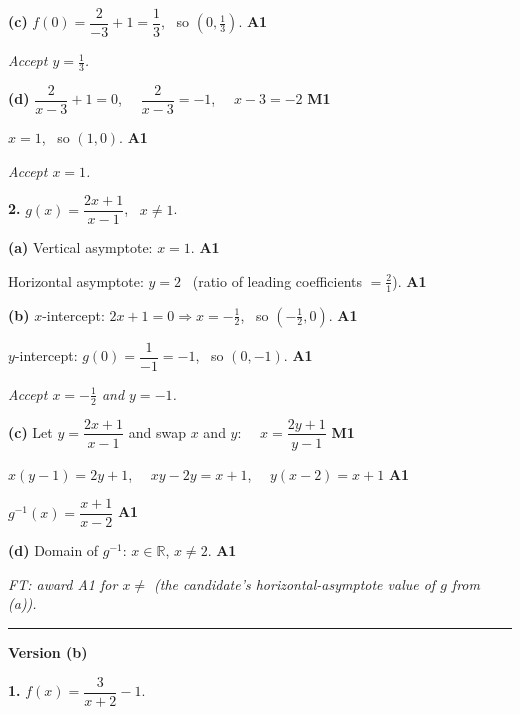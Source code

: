 \documentclass[12pt, twoside]{article}
\begin{document}
\textbf{(c)} $f(0)=\dfrac{2}{-3}+1=\dfrac{1}{3}$, \ so $\left(0,\tfrac{1}{3}\right)$. \hfill \textbf{A1}

\emph{Accept $y=\tfrac{1}{3}$.}

\medskip

\textbf{(d)} $\dfrac{2}{x-3}+1=0$, \ \ $\dfrac{2}{x-3}=-1$, \ \ $x-3=-2$ \hfill \textbf{M1}

$x=1$, \ so $(1,0)$. \hfill \textbf{A1}

\emph{Accept $x=1$.}

\medskip

\noindent\textbf{2.} $\displaystyle g(x)=\dfrac{2x+1}{x-1}$, \ $x\ne 1$.

\medskip

\textbf{(a)} Vertical asymptote: $x=1$. \hfill \textbf{A1}

Horizontal asymptote: $y=2$ \ (ratio of leading coefficients $=\tfrac{2}{1}$). \hfill \textbf{A1}

\medskip

\textbf{(b)} $x$-intercept: $2x+1=0 \Rightarrow x=-\tfrac{1}{2}$, \ so $\left(-\tfrac{1}{2},0\right)$. \hfill \textbf{A1}

$y$-intercept: $g(0)=\dfrac{1}{-1}=-1$, \ so $(0,-1)$. \hfill \textbf{A1}

\emph{Accept $x=-\tfrac{1}{2}$ and $y=-1$.}

\medskip

\textbf{(c)} Let $y=\dfrac{2x+1}{x-1}$ and swap $x$ and $y$: \ \ $x=\dfrac{2y+1}{y-1}$ \hfill \textbf{M1}

$x(y-1)=2y+1$, \ \ $xy-2y=x+1$, \ \ $y(x-2)=x+1$ \hfill \textbf{A1}

$g^{-1}(x)=\dfrac{x+1}{x-2}$ \hfill \textbf{A1}

\medskip

\textbf{(d)} Domain of $g^{-1}$: $x\in\mathbb{R}$, $x\ne 2$. \hfill \textbf{A1}

\emph{FT: award A1 for $x\ne$ (the candidate's horizontal-asymptote value of $g$ from (a)).}

\bigskip\hrule\bigskip

\noindent\textbf{\large Version (b)}

\bigskip

\noindent\textbf{1.} $\displaystyle f(x)=\dfrac{3}{x+2}-1$.
\end{document}

